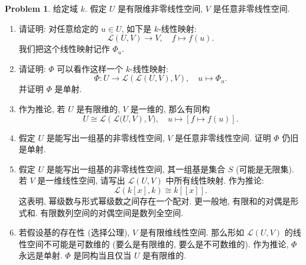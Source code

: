 \documentclass{MainStyle}
\theoremstyle{definition}
\newtheorem{problem}{Problem}
\begin{document}
\begin{problem}
给定域 $k$. 假定 $U$ 是有限维非零线性空间, $V$ 是任意非零线性空间.
\begin{enumerate}
    \item 请证明: 对任意给定的 $u\in U$, 如下是 $k$-线性映射:
          \begin{equation}
              \mathcal L(U,V)\to V,\quad f\mapsto f(u).
          \end{equation}
          我们把这个线性映射记作 $\Phi_u$.
    \item 请证明: $\Phi$ 可以看作这样一个 $k$-线性映射:
          \begin{equation}
              \Phi: U\to \mathcal L(\mathcal L(U,V) ,V),\quad u\mapsto \Phi_u.
          \end{equation}
          并证明 $\Phi$ 是单射.
    \item 作为推论, 若 $U$ 是有限维的, $V$ 是一维的, 那么有同构
          \begin{equation}
              U\cong \mathcal L(\mathcal L\mathcal (U,V),V),\quad u\mapsto [f\mapsto f(u)].
          \end{equation}
    \item 假定 $U$ 是能写出一组基的非零线性空间, $V$ 是任意非零线性空间. 证明 $\Phi$ 仍旧是单射.
    \item 假定 $U$ 是能写出一组基的非零线性空间, 其一组基是集合 $S$ (可能是无限集). 若 $V$ 是一维线性空间, 请写出 $\mathcal L(U,V)$ 中所有线性映射. 作为推论:
          \begin{equation}
              \mathcal L(k[x],k)\cong k[\![x]\!].
          \end{equation}
          这表明, 幂级数与形式幂级数之间存在一个配对. 更一般地, 有限和的对偶是形式和. 有限数列空间的对偶空间是数列全空间.
    \item 若假设基的存在性 (选择公理), $V$ 是有限维线性空间. 那么形如 $\mathcal L(U,V)$ 的线性空间不可能是可数维的 (要么是有限维的, 要么是不可数维的). 作为推论, $\Phi$ 永远是单射. $\Phi$ 是同构当且仅当 $U$ 是有限维的.
\end{enumerate}
\end{problem}
\end{document}
